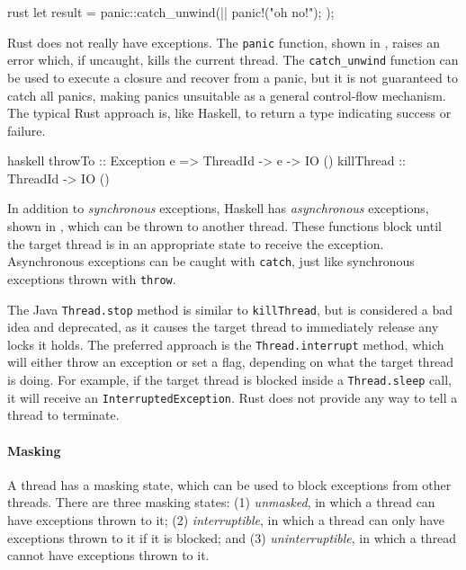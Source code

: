 \begin{listing}
\centering
\begin{cminted}{rust}
let result = panic::catch_unwind(|| {
    panic!("oh no!");
});
\end{cminted}
\caption{Panics in Rust.}\label{lst:excs_rust}
\end{listing}

Rust does not really have exceptions.  The \verb|panic| function,
shown in , raises an error which, if uncaught,
kills the current thread.  The \verb|catch_unwind| function can be
used to execute a closure and recover from a panic, but it is not
guaranteed to catch all panics\cite{catch_unwind}, making panics
unsuitable as a general control-flow mechanism.  The typical Rust
approach is, like Haskell, to return a type indicating success or
failure.

\begin{listing}
\centering
\begin{cminted}{haskell}
throwTo    :: Exception e => ThreadId -> e -> IO ()
killThread :: ThreadId -> IO ()
\end{cminted}
\caption{Asynchronous exceptions in Haskell.}\label{lst:excsa_haskell}
\end{listing}

In addition to \emph{synchronous} exceptions, Haskell has
\emph{asynchronous} exceptions, shown in ,
which can be thrown to another thread.  These functions block until
the target thread is in an appropriate state to receive the exception.
Asynchronous exceptions can be caught with \verb|catch|, just like
synchronous exceptions thrown with \verb|throw|.

The Java \verb|Thread.stop| method is similar to \verb|killThread|,
but is considered a bad idea and deprecated, as it causes the target
thread to immediately release any locks it holds\cite{oracle2017}.
The preferred approach is the \verb|Thread.interrupt| method, which
will either throw an exception or set a flag, depending on what the
target thread is doing.  For example, if the target thread is blocked
inside a \verb|Thread.sleep| call, it will receive an
\verb|InterruptedException|.  Rust does not provide any way to tell a
thread to terminate.

\paragraph{Masking}
A thread has a masking state, which can be used to block exceptions
from other threads.  There are three masking states: (1)
\emph{unmasked}, in which a thread can have exceptions thrown to it;
(2) \emph{interruptible}, in which a thread can only have exceptions
thrown to it if it is blocked; and (3) \emph{uninterruptible}, in
which a thread cannot have exceptions thrown to it.

